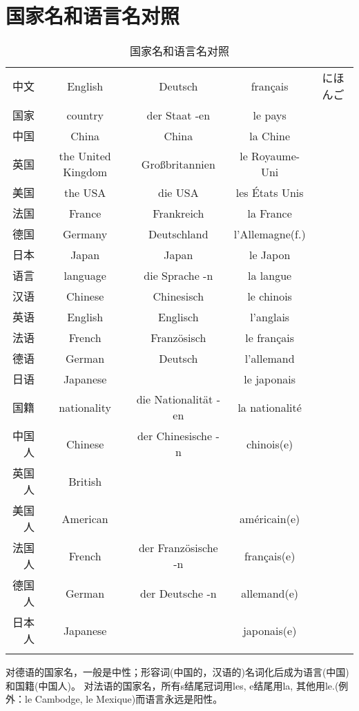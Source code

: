 \documentclass[12pt,A4paper,oneside,reqno]{amsart}
\numberwithin{equation}{section}
\theoremstyle{plain}
\theoremstyle{plain}
\theoremstyle{plain}
\numberwithin{equation}{section}
\theoremstyle{remark}
\begin{document}
\section{国家名和语言名对照}
\begin{table}[th]
	\begin{tabular}{r|c|c|c|c}								
\Xhline{1pt}  									
中文	&	English	&	Deutsch	&	français	&	にほんご	\\
\Xhline{1pt}  									
国家	&	country	&	der Staat -en	&	le pays	&		\\
\hline									
中国	&	China	&	China	&	la Chine	&		\\
英国	&	the United Kingdom	&	Gro\ss britannien	&	le Royaume-Uni	&		\\
美国	&	the USA	&	die USA	&	les \'{E}tats Unis	&		\\
法国	&	France	&	Frankreich	&	la France	&		\\
德国	&	Germany	&	Deutschland	&	l'Allemagne(f.)	&		\\
日本	&	Japan	&	Japan	&	le Japon	&		\\
\Xhline{1pt}  									
语言	&	language	&	die Sprache -n	&	la langue	&		\\
\hline									
汉语	&	Chinese	&	Chinesisch	&	le chinois	&		\\
英语	&	English	&	Englisch	&	l'anglais	&		\\
法语	&	French	&	Franz\"{o}sisch	&	le français	&		\\
德语	&	German	&	Deutsch	&	l'allemand	&		\\
日语	&	Japanese	&		&	le japonais	&		\\
\Xhline{1pt}  									
国籍	&	nationality	&	die Nationalit\"{a}t -en	&	la nationalit\'{e}	&		\\
\hline									
中国人	&	Chinese	&	der Chinesische -n	&	chinois(e)	&		\\
英国人	&	British	&		&		&		\\
美国人	&	American	&		&	am\'{e}ricain(e)	&		\\
法国人	&	French	&	der Franz\"{o}sische -n	&	français(e)	&		\\
德国人	&	German	&	der Deutsche -n	&	allemand(e)	&		\\
日本人	&	Japanese	&		&	japonais(e)	&		\\
\Xhline{1pt}  									
									
	
							
	\end{tabular}

	\vspace{0.5cm}
	\caption{国家名和语言名对照}
	\label{fig:country}
\end{table}
对德语的国家名，一般是中性；形容词(中国的，汉语的)名词化后成为语言(中国)和国籍(中国人)。
对法语的国家名，所有s结尾冠词用les, e结尾用la, 其他用le.(例外：le Cambodge, le Mexique)而语言永远是阳性。
\end{document}
